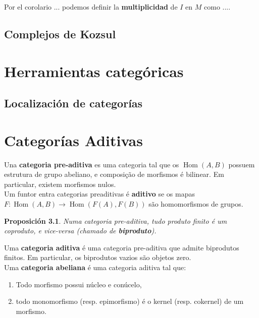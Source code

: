 \documentclass[12pt]{book}
\newtheorem{pro}{Proposición}
\begin{document}
Por el corolario ... podemos definir la \textbf{multiplicidad} de $I$ en $M$ como ....



\section{Complejos de Kozsul}



\chapter{Herramientas categóricas}


\section{Localización de categorías}





\chapter{Categorías Aditivas}


Una \textbf{categoria pre-aditiva} es uma categoria tal que os $\operatorname{Hom}(A,B)$ possuem estrutura de grupo abeliano, e composição de morfismos é bilinear. Em particular, existem morfismos nulos.\\
Um funtor entra categorias preaditivas é \textbf{aditivo} se os mapas $F:\operatorname{Hom}(A,B)\rightarrow \operatorname{Hom}(F(A),F(B))$ são homomorfismos de grupos. 

\begin{pro}
	Numa categoria pre-aditiva, tudo produto finito é um coproduto, e vice-versa (chamado de \textbf{biproduto}). 
\end{pro}

Uma \textbf{categoria aditiva} é uma categoria pre-aditiva que admite biprodutos finitos. Em particular, os biprodutos vazios são objetos zero.\\

Uma \textbf{categoria abeliana} é uma categoria aditiva tal que:
\begin{enumerate}
	\item Todo morfismo possui núcleo e conúcelo,
	\item todo monomorfismo (resp. epimorfismo) é o kernel (resp. cokernel) de um morfismo.
\end{enumerate}
\end{document}
